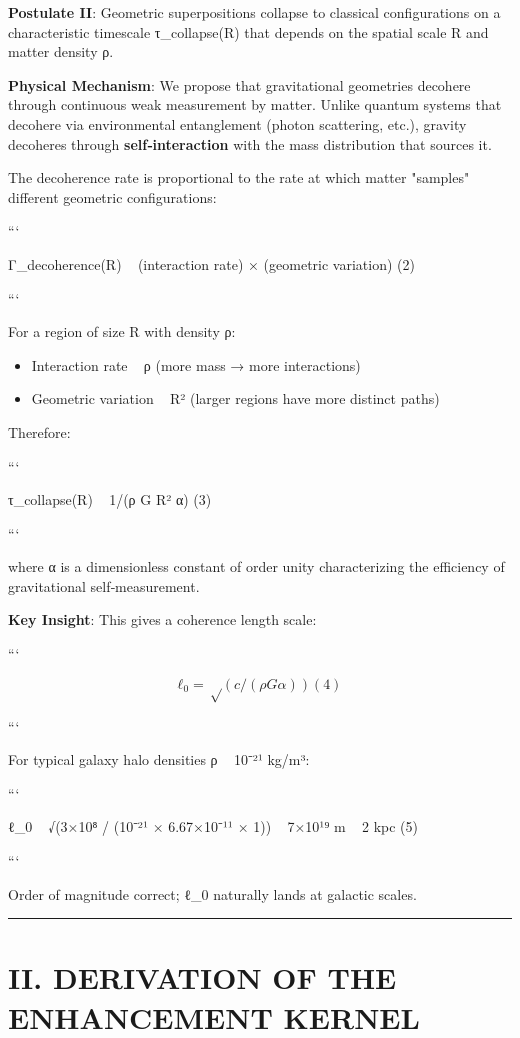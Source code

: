 \documentclass[11pt,a4paper]{article}
\begin{document}
\textbf{Postulate II}: Geometric superpositions collapse to classical configurations on a characteristic timescale τ\_collapse(R) that depends on the spatial scale R and matter density ρ.


\textbf{Physical Mechanism}: We propose that gravitational geometries decohere through continuous weak measurement by matter. Unlike quantum systems that decohere via environmental entanglement (photon scattering, etc.), gravity decoheres through \textbf{self‑interaction} with the mass distribution that sources it.


The decoherence rate is proportional to the rate at which matter "samples" different geometric configurations:


```

Γ\_decoherence(R) ~ (interaction rate) × (geometric variation)     (2)

```


For a region of size R with density ρ:

\begin{itemize}
\item Interaction rate ~ ρ (more mass → more interactions)
\item Geometric variation ~ R² (larger regions have more distinct paths)
\end{itemize}


Therefore:

```

τ\_collapse(R) ~ 1/(ρ G R² α)     (3)

```


where α is a dimensionless constant of order unity characterizing the efficiency of gravitational self‑measurement.


\textbf{Key Insight}: This gives a coherence length scale:

```

\[
ℓ_0 = √(c/(ρ G α))     (4)
\]

```


For typical galaxy halo densities ρ ~ 10⁻²¹ kg/m³:

```

ℓ\_0 ~ √(3×10⁸ / (10⁻²¹ × 6.67×10⁻¹¹ × 1)) ~ 7×10¹⁹ m ~ 2 kpc     (5)

```


Order of magnitude correct; ℓ\_0 naturally lands at galactic scales.


\medskip\hrule\medskip


\section{II. DERIVATION OF THE ENHANCEMENT KERNEL}
\end{document}
